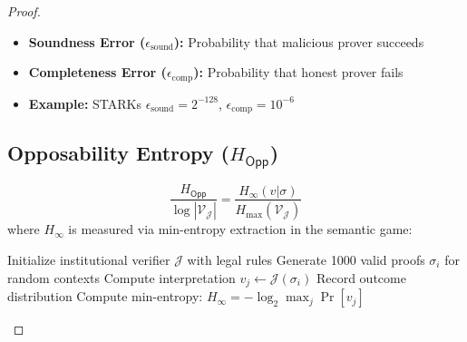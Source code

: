 \documentclass[preprint,12pt]{elsarticle}
\begin{document}
\begin{proof}
                \begin{itemize}
                    \item \textbf{Soundness Error ($\epsilon_{\mathrm{sound}}$):} Probability that malicious prover succeeds
                    \item \textbf{Completeness Error ($\epsilon_{\mathrm{comp}}$):} Probability that honest prover fails
                    \item \textbf{Example:} STARKs $\epsilon_{\mathrm{sound}} = 2^{-128}$, $\epsilon_{\mathrm{comp}} = 10^{-6}$ \cite{BenSasson2018}
                \end{itemize}

            \subsection{Opposability Entropy ($H_{\mathsf{Opp}}$)}\label{app:opposability}
                \[
                    \frac{H_{\mathsf{Opp}}}{\log|\mathcal{V_J}|} = \frac{H_\infty(v|\sigma)}{H_\max(\mathcal{V_J})}
                \]
                where $H_\infty$ is measured via min-entropy extraction in the semantic game:

                \begin{algorithm}[H]
                    \caption{Opposability Entropy Measurement}
                    \begin{algorithmic}[1]
                        \State Initialize institutional verifier $\mathcal{J}$ with legal rules
                        \State Generate 1000 valid proofs $\sigma_i$ for random contexts
                            \State Compute interpretation $v_j \gets \mathcal{J}(\sigma_i)$
                            \State Record outcome distribution
                        \EndFor
                        \State Compute min-entropy: $H_\infty = -\log_2 \max_j \Pr[v_j]$
                    \end{algorithmic}
                \end{algorithm}


\end{proof}
\end{document}
